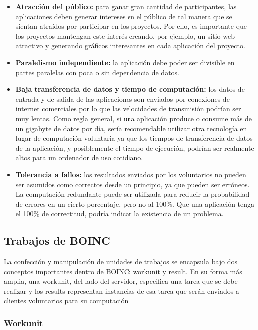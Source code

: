 \begin{itemize}
\item \textbf{Atracción del público:} para ganar gran cantidad de participantes, las aplicaciones deben generar intereses en el público de tal manera que se sientan atraídos por participar en los proyectos. Por ello, es importante que los proyectos mantengan este interés creando, por ejemplo, un sitio web atractivo y generando gráficos interesantes en cada aplicación del proyecto.
\item \textbf{Paralelismo independiente:} la aplicación debe poder ser divisible en partes paralelas con poca o sin dependencia de datos.
\item \textbf{Baja transferencia de datos y tiempo de computación:} los datos de entrada y de salida de las aplicaciones son enviados por conexiones de internet comerciales por lo que las velocidades de transmisión podrían ser muy lentas. Como regla general, si una aplicación produce o consume más de un gigabyte de datos por día, sería recomendable utilizar otra tecnología en lugar de computación voluntaria ya que los tiempos de transferencia de datos de la aplicación, y posiblemente el tiempo de ejecución, podrían ser realmente altos para un ordenador de uso cotidiano.
\item \textbf{Tolerancia a fallos:} los resultados enviados por los voluntarios no pueden ser asumidos como correctos desde un principio, ya que pueden ser erróneos. La computación redundante puede ser utilizada para reducir la probabilidad de errores en un cierto porcentaje, pero no al 100\%. Que una aplicación tenga el 100\% de correctitud, podría indicar la existencia de un problema.
\end{itemize}

\subsection{Trabajos de BOINC}

La confección y manipulación de unidades de trabajos se encapsula bajo dos conceptos importantes dentro de BOINC: workunit y result. En su forma más amplia, una workunit, del lado del servidor, especifica una tarea que se debe realizar y los results representan instancias de esa tarea que serán enviados a clientes voluntarios para su computación.

\subsubsection{Workunit}

